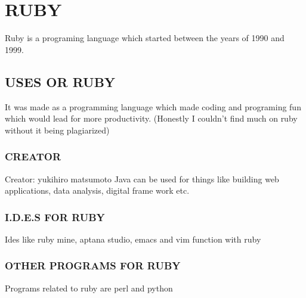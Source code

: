 \documentclass{article}
\begin{document}
	\section{RUBY}
	Ruby is a programing language which started between the years of 1990 and 1999. 
	\subsection{USES OR RUBY}
	It was made as a programming language which made coding and programing fun which would lead for more productivity. (Honestly I couldn’t find much on ruby without it being plagiarized)
	\subsubsection{CREATOR}
	Creator: yukihiro matsumoto
	Java  can be used for things like building web applications, data analysis, digital frame work etc.
	\subsubsection{I.D.E.S FOR RUBY}
	Ides like ruby mine, aptana studio, emacs and vim function with ruby
	\subsubsection{OTHER PROGRAMS FOR RUBY}
	Programs related to ruby are perl and python
	
	
	
\end{document}
